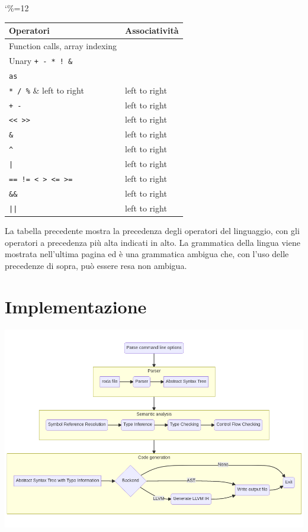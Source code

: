 \documentclass[a4paper]{article}
\begin{document}
\begingroup
\catcode`\%=12
\begin{table}[H]
\begin{tabularx}{0.55\textwidth}{|X|l|}
\hline
\textbf{Operatori} & \textbf{Associatività} \\
\hline
Function calls, array indexing & \\
\hline
Unary \verb?+ - * ! &? & \\
\hline
\verb?as? & \\
\hline
\verb?* / %? & left to right \\
\hline
\verb?+ -? & left to right \\
\hline
\verb?<< >>? & left to right \\
\hline
\verb?&? & left to right \\
\hline
\verb?^? & left to right \\
\hline
\verb?|? & left to right \\
\hline
\verb?== != < > <= >=? & left to right \\
\hline
\verb?&&? & left to right \\
\hline
\verb?||? & left to right \\
\hline
\end{tabularx}
\end{table}
\endgroup
La tabella precedente mostra la precedenza degli operatori del linguaggio, con gli operatori a
precedenza più alta indicati in alto. 
La grammatica della lingua viene mostrata nell'ultima pagina ed è una grammatica ambigua che,
con l'uso delle precedenze di sopra, può essere resa non ambigua.


\section{Implementazione}

\includegraphics[width=\textwidth]{implementation.png}
\end{document}
